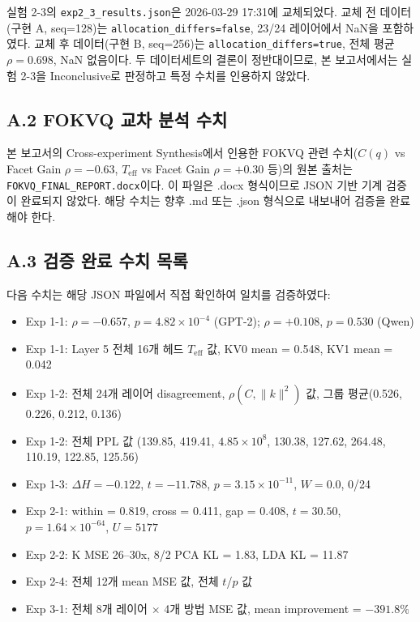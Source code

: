 \documentclass[11pt,a4paper]{article}
\begin{document}
실험 2-3의 \texttt{exp2\_3\_results.json}은 2026-03-29 17:31에 교체되었다.
교체 전 데이터(구현 A, seq=128)는 \texttt{allocation\_differs=false}, 23/24 레이어에서 NaN을 포함하였다.
교체 후 데이터(구현 B, seq=256)는 \texttt{allocation\_differs=true}, 전체 평균 $\rho = 0.698$, NaN 없음이다.
두 데이터세트의 결론이 정반대이므로, 본 보고서에서는 실험 2-3을 Inconclusive로 판정하고 특정 수치를 인용하지 않았다.

\subsection*{A.2 FOKVQ 교차 분석 수치}

본 보고서의 Cross-experiment Synthesis에서 인용한 FOKVQ 관련 수치($C(q)$ vs Facet Gain $\rho = -0.63$, $T_\mathrm{eff}$ vs Facet Gain $\rho = +0.30$ 등)의 원본 출처는 \texttt{FOKVQ\_FINAL\_REPORT.docx}이다.
이 파일은 .docx 형식이므로 JSON 기반 기계 검증이 완료되지 않았다.
해당 수치는 향후 .md 또는 .json 형식으로 내보내어 검증을 완료해야 한다.

\subsection*{A.3 검증 완료 수치 목록}

다음 수치는 해당 JSON 파일에서 직접 확인하여 일치를 검증하였다:
\begin{itemize}[nosep]
  \item Exp 1-1: $\rho = -0.657$, $p = 4.82 \times 10^{-4}$ (GPT-2); $\rho = +0.108$, $p = 0.530$ (Qwen)
  \item Exp 1-1: Layer 5 전체 16개 헤드 $T_\mathrm{eff}$ 값, KV0 mean = 0.548, KV1 mean = 0.042
  \item Exp 1-2: 전체 24개 레이어 disagreement, $\rho(C,\|k\|^2)$ 값, 그룹 평균(0.526, 0.226, 0.212, 0.136)
  \item Exp 1-2: 전체 PPL 값 (139.85, 419.41, $4.85 \times 10^8$, 130.38, 127.62, 264.48, 110.19, 122.85, 125.56)
  \item Exp 1-3: $\Delta H = -0.122$, $t = -11.788$, $p = 3.15 \times 10^{-11}$, $W = 0.0$, 0/24
  \item Exp 2-1: within = 0.819, cross = 0.411, gap = 0.408, $t = 30.50$, $p = 1.64 \times 10^{-64}$, $U = 5177$
  \item Exp 2-2: K MSE 26--30x, 8/2 PCA KL = 1.83, LDA KL = 11.87
  \item Exp 2-4: 전체 12개 mean MSE 값, 전체 $t$/$p$ 값
  \item Exp 3-1: 전체 8개 레이어 $\times$ 4개 방법 MSE 값, mean improvement = $-391.8\%$
\end{itemize}
\end{document}
